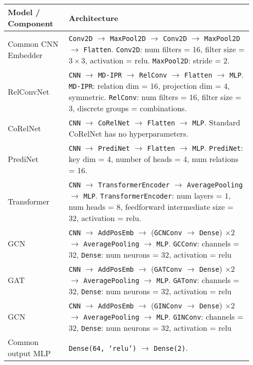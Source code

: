 \begin{tabular}{p{}p{}}
    \toprule
    Model / Component & Architecture \\ \midrule
    Common CNN \newline Embedder & \texttt{Conv2D} $\to$ \texttt{MaxPool2D} $\to$ \texttt{Conv2D} $\to$ \texttt{MaxPool2D} $\to$ \texttt{Flatten}. \newline
                        \texttt{Conv2D}: num filters = 16, filter size = $3 \times 3$, activation = relu. \newline
                        \texttt{MaxPool2D}: stride = 2. \\\hline
    RelConvNet        & \texttt{CNN} $\to$ \texttt{MD-IPR} $\to$ \texttt{RelConv} $\to$ \texttt{Flatten} $\to$ \texttt{MLP}. \newline
                        \texttt{MD-IPR}: relation dim = 16, projection dim = 4, symmetric. \newline
                        \texttt{RelConv}: num filters = 16, filter size = 3, discrete groups = combinations. \\\hline
    CoRelNet          & \texttt{CNN} $\to$ \texttt{CoRelNet} $\to$ \texttt{Flatten} $\to$ \texttt{MLP}. \newline
                        Standard CoRelNet has no hyperparameters. \\\hline
    PrediNet          & \texttt{CNN} $\to$ \texttt{PrediNet} $\to$ \texttt{Flatten} $\to$ \texttt{MLP}. \newline
                        \texttt{PrediNet}: key dim = 4, number of heads = 4, num relations = 16. \\\hline
    Transformer       & \texttt{CNN} $\to$ \texttt{TransformerEncoder} $\to$ \texttt{AveragePooling} $\to$ \texttt{MLP}. \newline
                    \texttt{TransformerEncoder}: num layers = 1, num heads = 8, feedforward intermediate size = 32, activation = relu. \\\hline
    GCN               &
        \texttt{CNN} $\to$ \texttt{AddPosEmb} $\to$ (\texttt{GCNConv} $\to$ \texttt{Dense}) $\times 2$ $\to$ \texttt{AveragePooling} $\to$ \texttt{MLP}. \newline
        \texttt{GCConv}: channels = 32, \texttt{Dense}: num neurons = 32, activation = relu \\\hline
    GAT               &
        \texttt{CNN} $\to$ \texttt{AddPosEmb} $\to$ (\texttt{GATConv} $\to$ \texttt{Dense}) $\times 2$ $\to$ \texttt{AveragePooling} $\to$ \texttt{MLP}. \newline
        \texttt{GATonv}: channels = 32, \texttt{Dense}: num neurons = 32, activation = relu \\\hline
    GCN               &
        \texttt{CNN} $\to$ \texttt{AddPosEmb} $\to$ (\texttt{GINConv} $\to$ \texttt{Dense}) $\times 2$ $\to$ \texttt{AveragePooling} $\to$ \texttt{MLP}. \newline
        \texttt{GINConv}: channels = 32, \texttt{Dense}: num neurons = 32, activation = relu \\\hline
                Common output MLP & \texttt{Dense(64, `relu')} $\to$ \texttt{Dense(2)}. \\ \bottomrule
\end{tabular}